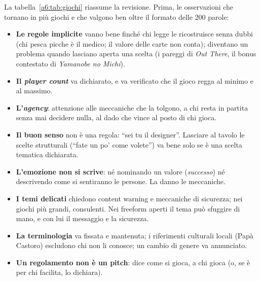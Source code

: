 La tabella~\ref{a6:tab:giochi} riassume la revisione. Prima, le osservazioni che
tornano in più giochi e che valgono ben oltre il formato delle 200 parole:
\begin{itemize}
  \item \textbf{Le regole implicite} vanno bene finché chi legge le ricostruisce
        senza dubbi (chi pesca picche è il medico; il valore delle carte non conta);
        diventano un problema quando lasciano aperta una scelta (i pareggi di
        \emph{Out There}, il bonus contestato di \emph{Yamanobe no Michi}).
  \item \textbf{Il \emph{player count}} va dichiarato, e va verificato che il gioco
        regga al minimo e al massimo.
  \item \textbf{L'\emph{agency}}: attenzione alle meccaniche che la tolgono, a chi
        resta in partita senza mai decidere nulla, al dado che vince al posto di chi
        gioca.
  \item \textbf{Il buon senso} non è una regola: ``sei tu il designer''. Lasciare al
        tavolo le scelte strutturali (``fate un po' come volete'') va bene solo se è
        una scelta tematica dichiarata.
  \item \textbf{L'emozione non si scrive}: né nominando un valore (\emph{successo})
        né descrivendo come si sentiranno le persone. La danno le meccaniche.
  \item \textbf{I temi delicati} chiedono content warning e meccaniche di sicurezza;
        nei giochi più grandi, consulenti. Nei freeform aperti il tema può sfuggire
        di mano, e con lui il messaggio e la sicurezza.
  \item \textbf{La terminologia} va fissata e mantenuta; i riferimenti culturali
        locali (Papà Castoro) escludono chi non li conosce; un cambio di genere va
        annunciato.
  \item \textbf{Un regolamento non è un pitch}: dice come si gioca, a chi gioca (o, se
        è per chi facilita, lo dichiara).
\end{itemize}

